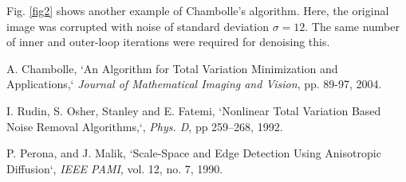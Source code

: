 \documentclass[11pt]{article}
\begin{document}
Fig. \ref{fig2} shows another example of Chambolle's algorithm. Here, the original image was corrupted with noise of standard deviation $\sigma = 12$. The same number of inner and outer-loop iterations were required for denoising this. 


\clearpage
\begin{thebibliography}{9}
\vspace{-9pt}


\small  %
\addtolength{\itemsep}{-8pt}

A. Chambolle, `An Algorithm for Total Variation Minimization and Applications,` \emph{Journal of Mathematical Imaging and Vision}, pp. 89-97, 2004. 

I. Rudin, S. Osher, Stanley and E. Fatemi, `Nonlinear Total Variation Based Noise Removal Algorithms,`, \emph{Phys. D}, pp 259--268, 1992.

P. Perona, and J. Malik, `Scale-Space and Edge Detection Using Anisotropic Diffusion`, \emph{IEEE PAMI}, vol. 12, no. 7, 1990.
\end{thebibliography}
\end{document}
